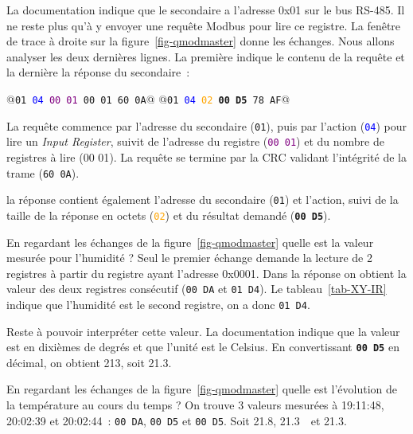     \vspace{1em}

La documentation indique que le secondaire a l'adresse 0x01 sur le bus RS-485. Il ne reste plus qu'à y envoyer une requête Modbus pour lire ce registre. La fenêtre de trace à droite sur la figure~\vref{fig-qmodmaster} donne les échanges. Nous allons analyser les deux dernières lignes. La première indique le contenu de la requête et la dernière la réponse du secondaire~:

\begin{termc}[backgroundcolor=\color{backcolour}, escapechar=@]
@\texttt{01 \textcolor{blue}{04} \textcolor{purple}{00 01} \textcolor{green!60!black}{00 01} \textcolor{black!30}{60 0A}}@
@\texttt{01 \textcolor{blue}{04} \textcolor{orange}{02} \textbf{00 D5} \textcolor{black!30}{78 AF}}@
\end{termc}

La requête commence par l'adresse du secondaire (\texttt{01}), puis par l'action (\texttt{\textcolor{blue}{04}}) pour lire un \textit{Input Register}, suivit de l'adresse du registre (\texttt{\textcolor{purple}{00 01}}) et du nombre de registres à lire (\textcolor{green!60!black}{00 01}). La requête se termine par la \ac{CRC} validant l'intégrité de la trame (\texttt{\textcolor{black!30}{60 0A}}).

la réponse contient également l'adresse du secondaire (\texttt{01}) et l'action, suivi de la taille de la réponse en octets (\texttt{\textcolor{orange}{02}}) et du résultat demandé (\texttt{\textbf{00 D5}}). 

{En regardant les échanges de la figure~\vref{fig-qmodmaster} quelle est la valeur mesurée pour l'humidité ?}
{Seul le premier échange demande la lecture de 2 registres à partir du registre ayant l'adresse 0x0001. Dans la réponse on obtient la valeur des deux registres consécutif (\texttt{00 DA} et \texttt{01 D4}). Le tableau~\vref{tab-XY-IR} indique que l'humidité est le second registre, on a donc \texttt{01 D4}.}

Reste à pouvoir interpréter cette valeur. La documentation indique que la valeur est en dixièmes de degrés et que l'unité est le Celsius. En convertissant \texttt{\textbf{00 D5}} en décimal, on obtient 213, soit 21.3\textcelsius.

{En regardant les échanges de la figure~\vref{fig-qmodmaster} quelle est l'évolution de la température au cours du temps ?}
{On trouve 3 valeurs mesurées à 19:11:48, 20:02:39 et 20:02:44~: \texttt{00 DA}, \texttt{00 D5} et \texttt{00 D5}. Soit 21.8\textcelsius, 21.3\textcelsius ~~et 21.3\textcelsius.}

